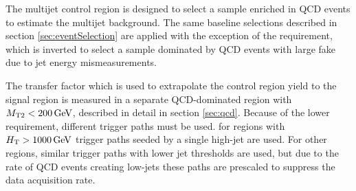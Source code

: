 The multijet control region is designed to select  a sample enriched in QCD events to estimate the multijet background. The same baseline selections described in section \ref{sec:eventSelection} are applied with the exception of the \dphilong requirement, which is inverted to select a sample dominated by QCD events with large fake \MET due to jet energy mismeasurements.

The transfer factor which is used to extrapolate the control region yield to the signal region is measured in a separate QCD-dominated region with $M_{\mathrm{T2}} < 200\,\text{Ge\hspace{-.08em}V}$, described in detail in section \ref{sec:qcd}. Because of the lower \MET requirement, different trigger paths must be used. for regions with $H_{\mathrm{T}} > 1000\,\text{Ge\hspace{-.08em}V}$ trigger paths seeded by a single high-\pt jet are used. For other \HT regions, similar trigger paths with lower jet \pt thresholds are used, but due to the rate of QCD events creating low-\pt jets these paths are prescaled to suppress the data acquisition rate.
